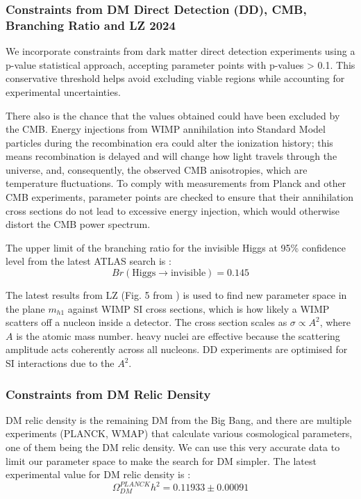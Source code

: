 \documentclass[12pt]{article}
\begin{document}
\subsubsection{Constraints from DM Direct Detection (DD), CMB, Branching Ratio and LZ 2024}
We incorporate constraints from dark matter direct detection experiments using a p-value statistical approach, accepting parameter points with p-values > 0.1. This conservative threshold helps avoid excluding viable regions while accounting for experimental uncertainties.

There also is the chance that the values obtained could have been excluded by the CMB. Energy injections from WIMP annihilation into Standard Model particles during the recombination era could alter the ionization history; this means recombination is delayed and will change how light travels through the universe, and, consequently, the observed CMB anisotropies, which are temperature fluctuations. To comply with measurements from Planck and other CMB experiments, parameter points are checked to ensure that their annihilation cross sections do not lead to excessive energy injection, which would otherwise distort the CMB power spectrum.

The upper limit of the branching ratio for the invisible Higgs at 95\% confidence level from the latest ATLAS search is \cite{ATLAS:2022yvh}:
\begin{equation}
    Br(\text{Higgs} \rightarrow \text{invisible}) = 0.145
    \label{eqn:branching_ratio}
\end{equation}

The latest results from LZ (Fig. 5 from \cite{aalbers2024darkmattersearchresults}) is used to find new parameter space in the plane $m_{h1}$ against WIMP SI cross sections, which is how likely a WIMP scatters off a nucleon inside a detector. The cross section scales as $\sigma \propto A^2$, where $A$ is the atomic mass number. heavy nuclei are effective because the scattering amplitude acts coherently across all nucleons. DD experiments are optimised for SI interactions due to the $A^2$.

\subsubsection{Constraints from DM Relic Density}
\label{sec:relic density}
DM relic density is the remaining DM from the Big Bang, and there are multiple experiments (PLANCK, WMAP) that calculate various cosmological parameters, one of them being the DM relic density. We can use this very accurate data to limit our parameter space to make the search for DM simpler. The latest experimental value for DM relic density is  \cite{Planck:2018vyg}:
\begin{equation}
    \Omega ^{PLANCK}_{DM} h^2 = 0.11933 \pm 0.00091
\end{equation}
\end{document}
